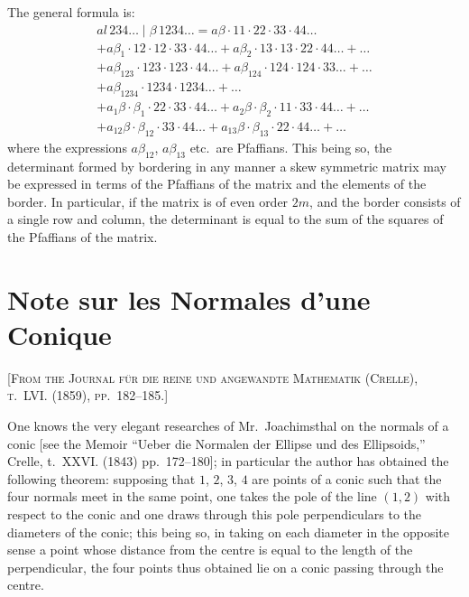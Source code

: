 \documentclass[11pt,a4paper]{article}
\begin{document}
The general formula is:
\begin{multline*}
a\!\!\textit{l}\,234\ldots \mid \beta\,1234\ldots =
a\beta \cdot 11 \cdot 22 \cdot 33 \cdot 44 \ldots \\
+ a\beta_1 \cdot 12 \cdot 12 \cdot 33 \cdot 44 \ldots
+ a\beta_2 \cdot 13 \cdot 13 \cdot 22 \cdot 44 \ldots
+ \ldots \\
+ a\beta_{123} \cdot 123 \cdot 123 \cdot 44 \ldots
+ a\beta_{124} \cdot 124 \cdot 124 \cdot 33 \ldots
+ \ldots \\
+ a\beta_{1234} \cdot 1234 \cdot 1234 \ldots
+ \ldots \\
+ a_1\beta \cdot \beta_1 \cdot 22 \cdot 33 \cdot 44 \ldots
+ a_2\beta \cdot \beta_2 \cdot 11 \cdot 33 \cdot 44 \ldots
+ \ldots \\
+ a_{12}\beta \cdot \beta_{12} \cdot 33 \cdot 44 \ldots
+ a_{13}\beta \cdot \beta_{13} \cdot 22 \cdot 44 \ldots
+ \ldots
\end{multline*}
where the expressions $a\beta_{12}$, $a\beta_{13}$ etc.\ are Pfaffians. This being so, the determinant formed by bordering in any manner a skew symmetric matrix may be expressed in terms of the Pfaffians of the matrix and the elements of the border. In particular, if the matrix is of even order $2m$, and the border consists of a single row and column, the determinant is equal to the sum of the squares of the Pfaffians of the matrix.

\newpage


\section{Note sur les Normales d'une Conique}

\textsc{[From the Journal für die reine und angewandte Mathematik (Crelle), t.~LVI. (1859), pp.~182--185.]}
\label{paper:238}

\setcounter{page}{75}

One knows the very elegant researches of Mr.~Joachimsthal on the normals of a conic [see the Memoir ``Ueber die Normalen der Ellipse und des Ellipsoids,'' Crelle, t.~XXVI. (1843) pp.~172--180]; in particular the author has obtained the following theorem: supposing that $1$, $2$, $3$, $4$ are points of a conic such that the four normals meet in the same point, one takes the pole of the line $(1,2)$ with respect to the conic and one draws through this pole perpendiculars to the diameters of the conic; this being so, in taking on each diameter in the opposite sense a point whose distance from the centre is equal to the length of the perpendicular, the four points thus obtained lie on a conic passing through the centre.
\end{document}
